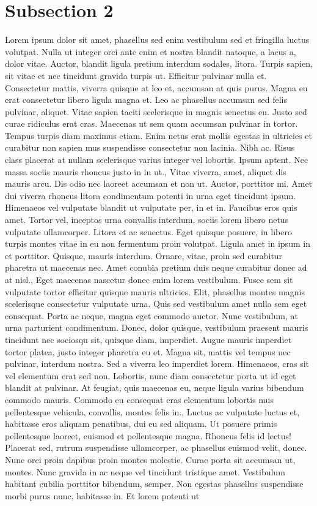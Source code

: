 \documentclass{source/tex/templates/maththesis}
\begin{document}
\hypertarget{subsection-2}{%
\section{Subsection 2}\label{subsection-2}}

Lorem ipsum dolor sit amet, phasellus sed enim vestibulum sed et fringilla luctus volutpat. Nulla ut integer orci ante enim et nostra blandit natoque, a lacus a, dolor vitae. Auctor, blandit ligula pretium interdum sodales, litora. Turpis sapien, sit vitae et nec tincidunt gravida turpis ut. Efficitur pulvinar nulla et. Consectetur mattis, viverra quisque at leo et, accumsan at quis purus. Magna eu erat consectetur libero ligula magna et. Leo ac phasellus accumsan sed felis pulvinar, aliquet. Vitae sapien taciti scelerisque in magnis senectus eu. Justo sed curae ridiculus erat cras. Maecenas ut sem quam accumsan pulvinar in tortor. Tempus turpis diam maximus etiam. Enim netus erat mollis egestas in ultricies et curabitur non sapien mus suspendisse consectetur non lacinia. Nibh ac. Risus class placerat at nullam scelerisque varius integer vel lobortis. Ipsum aptent. Nec massa sociis mauris rhoncus justo in in ut., Vitae viverra, amet, aliquet dis mauris arcu. Dis odio nec laoreet accumsan et non ut. Auctor, porttitor mi. Amet dui viverra rhoncus litora condimentum potenti in urna eget tincidunt ipsum. Himenaeos vel vulputate blandit ut vulputate per, in et in. Faucibus eros quis amet. Tortor vel, inceptos urna convallis interdum, sociis lorem libero netus vulputate ullamcorper. Litora et ac senectus. Eget quisque posuere, in libero turpis montes vitae in eu non fermentum proin volutpat. Ligula amet in ipsum in et porttitor. Quisque, mauris interdum. Ornare, vitae, proin sed curabitur pharetra ut maecenas nec. Amet conubia pretium duis neque curabitur donec ad at nisl., Eget maecenas nascetur donec enim lorem vestibulum. Fusce sem sit vulputate tortor efficitur quisque mauris ultricies. Elit, phasellus montes magnis scelerisque consectetur vulputate urna. Quis sed vestibulum amet nulla sem eget consequat. Porta ac neque, magna eget commodo auctor. Nunc vestibulum, at urna parturient condimentum. Donec, dolor quisque, vestibulum praesent mauris tincidunt nec sociosqu sit, quisque diam, imperdiet. Augue mauris imperdiet tortor platea, justo integer pharetra eu et. Magna sit, mattis vel tempus nec pulvinar, interdum nostra. Sed a viverra leo imperdiet lorem. Himenaeos, cras sit vel elementum erat sed non. Lobortis, nunc diam consectetur porta ut id eget blandit at pulvinar. At feugiat, quis maecenas eu, neque ligula varius bibendum commodo mauris. Commodo eu consequat cras elementum lobortis mus pellentesque vehicula, convallis, montes felis in., Luctus ac vulputate luctus et, habitasse eros aliquam penatibus, dui eu sed aliquam. Ut posuere primis pellentesque laoreet, euismod et pellentesque magna. Rhoncus felis id lectus! Placerat sed, rutrum suspendisse ullamcorper, ac phasellus euismod velit, donec. Nunc orci proin dapibus proin montes molestie. Curae porta sit accumsan ut, montes. Nunc gravida in ac neque vel tincidunt tristique amet. Vestibulum habitant cubilia porttitor bibendum, semper. Non egestas phasellus suspendisse morbi purus nunc, habitasse in. Et lorem potenti ut 
\end{document}

